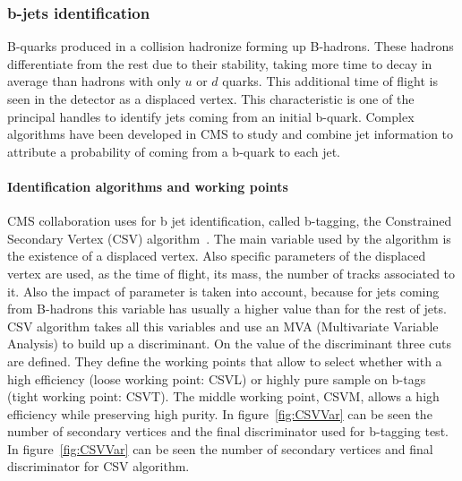 \subsubsection{b-jets identification}
\label{sec:bid}

B-quarks produced in a collision hadronize forming up B-hadrons. These hadrons differentiate from the rest due to their stability, taking more time to decay in average than hadrons with only $u$ or $d$ quarks. This additional time of flight is seen in the detector as a displaced vertex. This characteristic is one of the principal handles to identify jets coming from an initial b-quark. Complex algorithms have been developed in CMS to study and combine jet information to attribute a probability of coming from a b-quark to each jet.  

\paragraph{Identification algorithms and working points}

CMS collaboration uses for b jet identification, called b-tagging, the Constrained Secondary Vertex (CSV) algorithm~\cite{Chatrchyan:2012jua, CMS:2013vea}. The main variable used by the algorithm is the existence of a displaced vertex. Also specific parameters of the displaced vertex are used, as the time of flight, its mass, the number of tracks associated to it. Also the impact of parameter is taken into account, because for jets coming from B-hadrons this variable has usually a higher value than for the rest of jets. CSV algorithm takes all this variables and use an MVA (Multivariate Variable Analysis) to build up a discriminant. On the value of the discriminant three cuts are defined. They define the working points that allow to select whether with a high efficiency (loose working point: CSVL) or highly pure sample on b-tags (tight working point: CSVT). The middle working point, CSVM, allows a high efficiency while preserving high purity. In figure~\ref{fig:CSVVar} can be seen the number of secondary vertices and the final discriminator used for b-tagging test. In figure~\ref{fig:CSVVar} can be seen the number of secondary vertices and final discriminator for CSV algorithm.

